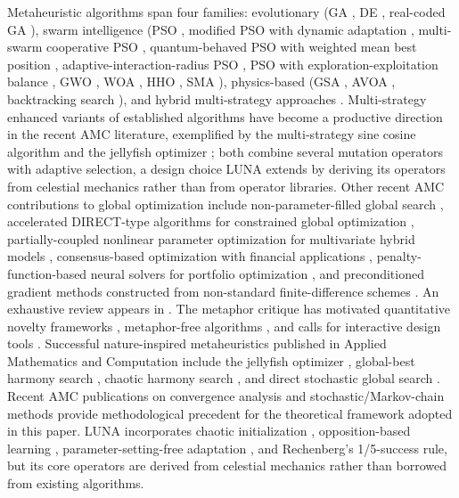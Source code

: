 \documentclass[review]{elsarticle}
\theoremstyle{definition}
\begin{document}
Metaheuristic algorithms span four families: evolutionary (GA \cite{18}, DE \cite{13}, real-coded GA \cite{amc10}), swarm intelligence (PSO \cite{17}, modified PSO with dynamic adaptation \cite{amc5}, multi-swarm cooperative PSO \cite{amc13}, quantum-behaved PSO with weighted mean best position \cite{amc12}, adaptive-interaction-radius PSO \cite{amcrec5}, PSO with exploration-exploitation balance \cite{amcrec6}, GWO \cite{10}, WOA \cite{11}, HHO \cite{12}, SMA \cite{20}), physics-based (GSA \cite{19}, AVOA \cite{21}, backtracking search \cite{amc1}), and hybrid multi-strategy approaches \cite{amc4,amc6,amc7,amc8,amc9,amc16}. Multi-strategy enhanced variants of established algorithms have become a productive direction in the recent AMC literature, exemplified by the multi-strategy sine cosine algorithm \cite{amcrec9} and the jellyfish optimizer \cite{amcrec8}; both combine several mutation operators with adaptive selection, a design choice LUNA extends by deriving its operators from celestial mechanics rather than from operator libraries. Other recent AMC contributions to global optimization include non-parameter-filled global search \cite{amcrec11}, accelerated DIRECT-type algorithms for constrained global optimization \cite{amcrec12}, partially-coupled nonlinear parameter optimization for multivariate hybrid models \cite{amcrec10}, consensus-based optimization with financial applications \cite{amcrec13}, penalty-function-based neural solvers for portfolio optimization \cite{amcrec14}, and preconditioned gradient methods constructed from non-standard finite-difference schemes \cite{amcrec18}. An exhaustive review appears in \cite{23}. The metaphor critique \cite{5,6,24} has motivated quantitative novelty frameworks \cite{15,16}, metaphor-free algorithms \cite{17d}, and calls for interactive design tools \cite{17c}. Successful nature-inspired metaheuristics published in Applied Mathematics and Computation include the jellyfish optimizer \cite{amc3,amcrec8}, global-best harmony search \cite{amc2}, chaotic harmony search \cite{amc11}, and direct stochastic global search \cite{amc17}. Recent AMC publications on convergence analysis \cite{amcrec1,amcrec2,amcrec16,amcrec17} and stochastic/Markov-chain methods \cite{amcrec3,amcrec4,amcrec15} provide methodological precedent for the theoretical framework adopted in this paper. LUNA incorporates chaotic initialization \cite{22,amc14}, opposition-based learning \cite{8}, parameter-setting-free adaptation \cite{amc15}, and Rechenberg's 1/5-success rule, but its core operators are derived from celestial mechanics rather than borrowed from existing algorithms.
\end{document}
